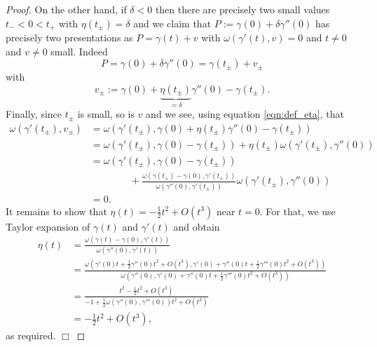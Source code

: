 \documentclass[12pt]{article}
\newcommand{\proofend}{$\Box$\bigskip}
\begin{document}
\begin{proof}
On the other hand, if $\delta<0$ then there are precisely two small values $t_-<0<t_+$ with $\eta(t_\pm)=\delta$ and we claim that $P:=\gamma(0)+\delta\gamma''(0)$ has precisely two presentations as $P=\gamma(t)+v$ with $\omega(\gamma'(t),v)=0$ and $t\neq0$ and $v\neq0$ small. Indeed
\begin{equation}\nonumber
P=\gamma(0)+\delta\gamma''(0)=\gamma(t_\pm)+v_\pm
\end{equation}
with 
\begin{equation}\nonumber
v_\pm:=\gamma(0)+\underbrace{\eta(t_\pm)}_{=\delta} \gamma''(0) - \gamma(t_\pm).
\end{equation}
Finally, since $t_\pm$ is small, so is $v$ and we see, using equation \eqref{eqn:def_eta}, that
\begin{equation}\nonumber
\begin{aligned}
\omega(\gamma'(t_\pm),v_\pm)&=\omega(\gamma'(t_\pm),\gamma(0)+\eta(t_\pm) \gamma''(0) - \gamma(t_\pm))\\
&=\omega(\gamma'(t_\pm),\gamma(0) - \gamma(t_\pm)) +\eta(t_\pm) \omega(\gamma'(t_\pm),\gamma''(0))\\
&=\omega(\gamma'(t_\pm),\gamma(0) - \gamma(t_\pm))\\&\qquad\qquad +\frac{\omega(\gamma(t_\pm)-\gamma(0),\gamma'(t_\pm))}{\omega(\gamma''(0),\gamma'(t_\pm))}\omega(\gamma'(t_\pm),\gamma''(0))\\
&=0.
\end{aligned}
\end{equation}
It remains to show that $\eta(t)=-\tfrac12t^2+O(t^3)$ near $t=0$. For that, we use Taylor expansion of $\gamma(t)$ and $\gamma'(t)$ and obtain
\begin{equation}\nonumber
\begin{aligned}
\eta(t)&=\frac{\omega(\gamma(t)-\gamma(0),\gamma'(t))}{\omega(\gamma''(0),\gamma'(t))}\\
&=\frac{\omega(\gamma'(0)t+\tfrac12\gamma''(0)t^2 +O(t^3),\gamma'(0)+\gamma''(0)t+\tfrac12\gamma'''(0)t^2+O(t^3))}{\omega(\gamma''(0),\gamma'(0)+\gamma''(0)t+\tfrac12\gamma'''(0)t^2+O(t^3))}\\
&=\frac{t^2-\tfrac12t^2+O(t^3)}{-1+\tfrac12\omega(\gamma''(0),\gamma'''(0))t^2+O(t^3)}\\
&=-\tfrac12t^2+O(t^3),
\end{aligned}
\end{equation} 
as required. \proofend 
\end{proof}
\end{document}
